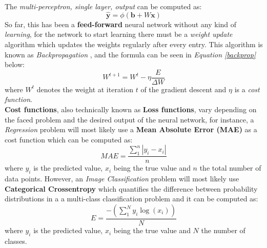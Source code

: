 \documentclass[12pt]{extarticle}
\begin{document}
	The \emph{multi-perceptron, single layer, output} can be computed as:
	\begin{equation}\label{y_hat}
		\bm{\hat{y}} = \phi(\bm{b}+ W\bm{x})
	\end{equation}
	So far, this has been a \textbf{feed-forward} neural network without any kind of \emph{learning}, for the network to start learning there must be a \emph{weight update} algorithm which updates the weights regularly after every entry. This algorithm is known as \emph{Backpropagation} \cite{backprop}, and the formula can be seen in \emph{Equation \ref{backprop}} below: 
	\begin{equation}\label{backprop}
		W^{t+1} = W^{t} - \eta\dfrac{E}{\Delta{W}}
	\end{equation}
	where $W^{t}$ denotes the weight at iteration $t$ of the gradient descent and $\eta$ is a \emph{cost function}.\\[5mm]
	\textbf{Cost functions}, also technically known as \textbf{Loss functions}, vary depending on the faced problem and the desired output of the neural network, for instance, a \emph{Regression} problem will most likely use a \textbf{Mean Absolute Error (MAE)}\cite{qi2020mean} as a cost function which can be computed as:
	\begin{equation}\label{MAE}
		MAE = \dfrac{\sum_{1}^{n}|y_i-x_i|}{n}
	\end{equation}
	where $y_i$ is the predicted value, $x_i$ being the true value and $n$ the total number of data points. However, an \emph{Image Classification} problem will most likely use \textbf{Categorical Crossentropy}\cite{ho2019real} which quantifies the difference between probability distributions in a a multi-class classification problem and it can be computed as:
	\begin{equation}\label{crossentro}
		E = \dfrac{-(\sum_{1}^{N}y_i\log(x_i))}{N}
	\end{equation}
	where $y_i$ is the predicted value, $x_i$ being the true value and $N$ the number of classes.

	
\end{document}
